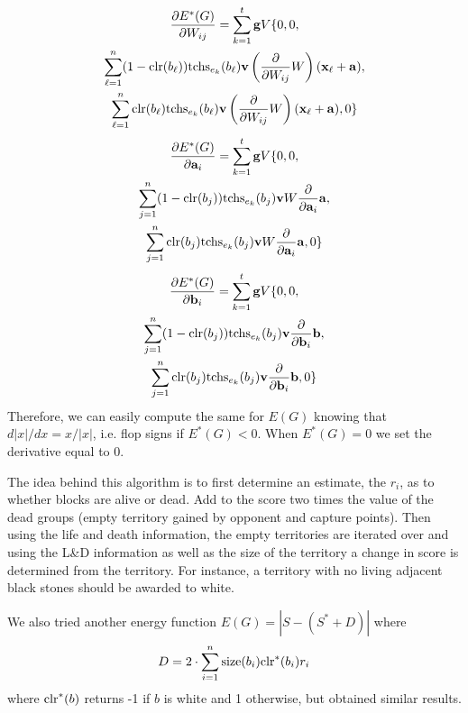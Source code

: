 \documentclass[11pt,letterpaper]{article}
\begin{document}
\begin{gather*}
\frac{ \partial E^*(G) }{ \partial W_{ i j } }  = \sum_{ k = 1 }^t \mathbf{ g } V \{ 0, 0,\\
  \sum_{ \ell = 1 }^n (1 - \mbox{clr}{\left( b_\ell \right)}) \mbox{tchs}_{ e_k }{\left( b_\ell \right)} \mathbf{ v }
  \left(\frac{ \partial }{ \partial W_{ i j } } W\right) (\mathbf{ x }_\ell + \mathbf{ a }),\\
  \sum_{ \ell = 1 }^n \mbox{clr}{\left( b_\ell \right)} \mbox{tchs}_{ e_k }{\left( b_\ell \right)} \mathbf{ v }
  \left(\frac{ \partial }{ \partial W_{ i j } } W\right) (\mathbf{ x }_\ell + \mathbf{ a }), 0 \}
\end{gather*}
\begin{gather*}
\frac{ \partial E^*(G) }{ \partial \mathbf{ a }_i } = \sum_{ k = 1 }^t \mathbf{ g } V \{ 0, 0,\\
  \sum_{ j = 1 }^n (1 - \mbox{clr}{\left( b_j \right)}) \mbox{tchs}_{ e_k }{\left( b_j \right)}
  \mathbf{ v } W \frac{ \partial }{ \partial \mathbf{ a }_i } \mathbf{ a },\\
  \sum_{ j = 1 }^n \mbox{clr}{\left( b_j \right)} \mbox{tchs}_{ e_k }{\left( b_j \right)}
  \mathbf{ v } W \frac{ \partial }{ \partial \mathbf{ a }_i } \mathbf{ a }, 0 \}
\end{gather*}
\begin{gather*}
\frac{ \partial E^*(G) }{ \partial \mathbf{ b }_i } = \sum_{ k = 1 }^t \mathbf{ g } V \{ 0, 0,\\
  \sum_{ j = 1 }^n (1 - \mbox{clr}{\left( b_j \right)}) \mbox{tchs}_{ e_k }{\left( b_j \right)}
  \mathbf{ v } \frac{ \partial }{ \partial \mathbf{ b }_i } \mathbf{ b },\\
  \sum_{ j = 1 }^n \mbox{clr}{\left( b_j \right)} \mbox{tchs}_{ e_k }{\left( b_j \right)}
  \mathbf{ v } \frac{ \partial }{ \partial \mathbf{ b }_i } \mathbf{ b }, 0 \}
\end{gather*}
Therefore, we can easily compute the same for $E(G)$ knowing that $d |x| / dx = x / |x|$, i.e. flop signs if
$E^*(G) < 0$. When $E^*(G) = 0$ we set the derivative equal to 0.

The idea behind this algorithm is to first determine an estimate, the $r_i$, as to whether blocks are alive or dead.
Add to the score two times the value of the dead groups (empty territory gained by opponent and capture points).
Then using the life and death information, the empty territories are iterated over and using the L\&D information as
well as the size of the territory a change in score is determined from the territory. For instance, a territory with no
living adjacent black stones should be awarded to white.

We also tried another energy function $E(G) = |S - (S^* + D)|$ where
$$D = 2 \cdot \sum_{ i = 1 }^n \mbox{size}{\left( b_i \right)} \mbox{clr}^*{\left( b_i \right)} r_i$$
where $\mbox{clr}^*{\left( b \right)}$ returns -1 if $b$ is white and 1 otherwise, but obtained similar results.
\end{document}
